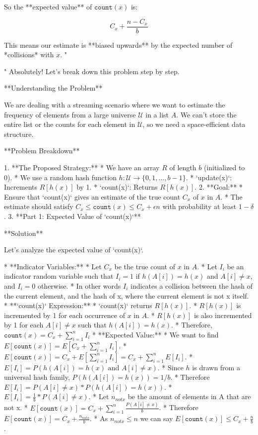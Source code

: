 \begin{enumerate}
\begin{shaded}
So the **expected value** of \(\texttt{count}(x)\) is:

\[
\boxed{C_x + \frac{n - C_x}{b}}
\]

This means our estimate is **biased upwards** by the expected number of *collisions* with \( x \).
"

"
Absolutely! Let's break down this problem step by step.

**Understanding the Problem**

We are dealing with a streaming scenario where we want to estimate the frequency of elements from a large universe $\mathcal{U}$ in a list $A$. We can't store the entire list or the counts for each element in $\mathcal{U}$, so we need a space-efficient data structure.

**Problem Breakdown**

1.  **The Proposed Strategy:**
    * We have an array $R$ of length $b$ (initialized to 0).
    * We use a random hash function $h: \mathcal{U} \to \{0, 1, \ldots, b - 1\}$.
    * `update(x)`: Increments $R[h(x)]$ by 1.
    * `count(x)`: Returns $R[h(x)]$.
2.  **Goal:**
    * Ensure that `count(x)` gives an estimate of the true count $C_x$ of $x$ in $A$.
    * The estimate should satisfy $C_x \le \texttt{count}(x) \le C_x + \epsilon n$ with probability at least $1 - \delta$.
3.  **Part 1: Expected Value of `count(x)`**

**Solution**

Let's analyze the expected value of `count(x)`.

* **Indicator Variables:**
    * Let $C_x$ be the true count of $x$ in $A$.
    * Let $I_i$ be an indicator random variable such that $I_i = 1$ if $h(A[i]) = h(x)$ and $A[i] \neq x$, and $I_i = 0$ otherwise.
    * In other words $I_i$ indicates a collision between the hash of the current element, and the hash of x, where the current element is not x itself.
* **`count(x)` Expression:**
    * `count(x)` returns $R[h(x)]$.
    * $R[h(x)]$ is incremented by 1 for each occurrence of $x$ in $A$.
    * $R[h(x)]$ is also incremented by 1 for each $A[i] \neq x$ such that $h(A[i]) = h(x)$.
    * Therefore, $\texttt{count}(x) = C_x + \sum_{i=1}^{n} I_i$
* **Expected Value:**
    * We want to find $E[\texttt{count}(x)] = E[C_x + \sum_{i=1}^{n} I_i]$.
    * $E[\texttt{count}(x)] = C_x + E[\sum_{i=1}^{n} I_i] = C_x + \sum_{i=1}^{n} E[I_i]$.
    * $E[I_i] = P(h(A[i]) = h(x) \text{ and } A[i] \neq x)$.
    * Since $h$ is drawn from a universal hash family, $P(h(A[i]) = h(x)) = 1/b$.
    * Therefore $E[I_i] = P(A[i] \neq x) * P(h(A[i]) = h(x))$.
    * $E[I_i] = \frac{1}{b} * P(A[i] \neq x)$.
    * Let $n_{notx}$ be the amount of elements in A that are not x.
    * $E[\texttt{count}(x)] = C_x + \sum_{i=1}^{n} \frac{P(A[i] \neq x)}{b}$.
    * Therefore $E[\texttt{count}(x)] = C_x + \frac{n_{notx}}{b}$.
    * As $n_{notx} \le n$ we can say $E[\texttt{count}(x)] \le C_x + \frac{n}{b}$.


\end{shaded}
\end{enumerate}
